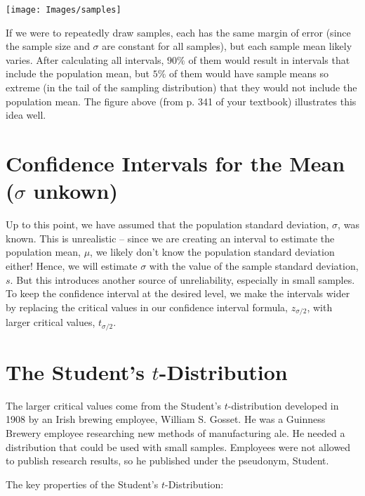 \documentclass[12pt, letterpaper]{article}
\theoremstyle{definition}
\begin{document}
\begin{center}
\texttt{[image: Images/samples]}
\end{center}

\noindent If we were to repeatedly draw samples, each has the same margin of error (since the sample size and $\sigma$ are constant for all samples), but each sample mean likely varies.  After calculating all intervals, $90\%$ of them would result in intervals that include the population mean, but $5\%$ of them would have sample means so extreme (in the tail of the sampling distribution) that they would not include the population mean.  The figure above (from p. 341 of your textbook) illustrates this idea well.


\newpage

\section*{Confidence Intervals for the Mean ($\sigma$ unkown)}

\noindent Up to this point, we have assumed that the population standard deviation, $\sigma$, was known.  This is unrealistic -- since we are creating an interval to estimate the population mean, $\mu$, we likely don't know the population standard deviation either!  Hence, we will estimate $\sigma$ with the value of the sample standard deviation, $s$.  But this introduces another source of unreliability, especially in small samples.  To keep the confidence interval at the desired level, we make the intervals wider by replacing the critical values in our confidence interval formula, $z_{\sigma/2}$, with larger critical values, $t_{\sigma/2}$.


\section*{The Student's $t$-Distribution}

\noindent The larger critical values come from the Student's $t$-distribution developed in 1908 by an Irish brewing employee, William S. Gosset.  He was a Guinness Brewery employee researching new methods of manufacturing ale.  He needed a distribution that could be used with small samples.  Employees were not allowed to publish research results, so he published under the pseudonym, Student.

\vspace*{.1in}

\noindent The key properties of the Student's $t$-Distribution:
\end{document}
